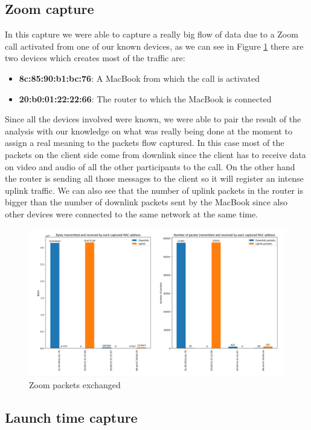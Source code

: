 \subsection{Zoom capture}
In this capture we were able to capture a really big flow of data due to a Zoom call activated from 
one of our known devices, as we can see in Figure \ref{fig:Zoom_packets} there are two devices which
creates most of the traffic are:
\begin{itemize}
    \item \textbf{8c:85:90:b1:bc:76}: A MacBook from which the call is activated 
    \item \textbf{20:b0:01:22:22:66}: The router to which the MacBook is connected 
\end{itemize}
Since all the devices involved were known, we were able to pair the result of the analysis with our 
knowledge on what was really being done at the moment to assign a real meaning to the packets flow 
captured. In this case most of the packets on the client side come from downlink since the client 
has to receive data on video and audio of all the other participants to the call. On the other hand
the router is sending all those messages to the client so it will register an intense uplink traffic.
We can also see that the number of uplink packets in the router is bigger than the number of downlink
packets sent by the MacBook since also other devices were connected to the same network at the same
time. 
\begin{figure}[h!]
    \includegraphics[width=\textwidth]{Graphs/Zoom_bytes_packets.png}
    \caption{Zoom packets exchanged}
    \label{fig:Zoom_packets}
\end{figure}




\subsection{Launch time capture}

